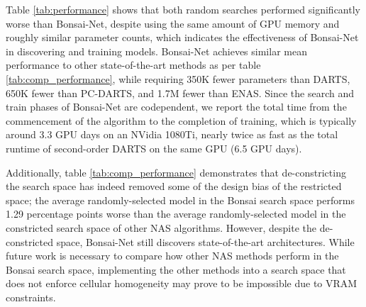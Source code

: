 \documentclass[10pt,twocolumn,letterpaper]{article}
\begin{document}
Table \ref{tab:performance} shows that both random searches performed significantly worse than Bonsai-Net, despite using the same amount of GPU memory and roughly similar parameter counts, which indicates the effectiveness of Bonsai-Net in discovering and training models. Bonsai-Net achieves similar mean performance to other state-of-the-art methods as per table \ref{tab:comp_performance}, while requiring 350K fewer parameters than DARTS, 650K fewer than PC-DARTS, and 1.7M fewer than ENAS. Since the search and train phases of Bonsai-Net are codependent, we report the total time from the commencement of the algorithm to the completion of training, which is typically around 3.3 GPU days on an NVidia 1080Ti, nearly twice as fast as the total runtime of second-order DARTS on the same GPU (6.5 GPU days).  

Additionally, table \ref{tab:comp_performance} demonstrates that de-constricting the search space has indeed removed some of the design bias of the restricted space; the average randomly-selected model in the Bonsai search space performs 1.29 percentage points worse than the average randomly-selected model in the constricted search space of other NAS algorithms. However, despite the de-constricted space, Bonsai-Net still discovers state-of-the-art architectures. While future work is necessary to compare how other NAS methods perform in the Bonsai search space, implementing the other methods into a search space that does not enforce cellular homogeneity may prove to be impossible due to VRAM constraints.
\end{document}
